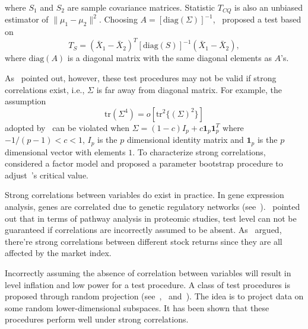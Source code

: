 \documentclass[review]{elsarticle}
\theoremstyle{plain}
\theoremstyle{definition}
\theoremstyle{remark}
\begin{document}
where $S_1$ and $S_2$ are sample covariance matrices. Statistic $T_{CQ}$ 
is also an unbiased estimator of $\|\mu_1-\mu_2\|^2$. Choosing $A={[\mathrm{diag}(\Sigma)]}^{-1}$,~\cite{Srivastava2008A} proposed a test based on
\begin{equation*}
    T_{S}={(\bar{X}_1-\bar{X}_2)}^T {[\mathrm{diag}(S)]}^{-1}(\bar{X}_1-\bar{X}_2),
\end{equation*}
where $\textrm{diag} (A)$ is a diagonal matrix with the same diagonal elements as $A$'s.

As~\cite{Ma2015A} pointed out, however, these test procedures may not be valid if strong correlations exist, i.e., $\Sigma$ is far away from diagonal matrix. For example, the assumption 
\begin{equation}\label{chenscondition}
\mathrm{tr}(\Sigma^4)=o[\mathrm{tr}^2\{{(\Sigma)}^2\}]
\end{equation}
adopted by~\cite{Chen2010A} can be violated when $\Sigma=(1-c)I_p+c\bm{1}_p \bm{1}_p^T$ where $-{1}/{(p-1)}<c<1$, $I_p$ is the $p$ dimensional identity matrix and $\bm{1}_p$ is the $p$ dimensional vector  with elements $1$.
To characterize strong correlations,~\cite{Ma2015A} considered a factor model and proposed a parameter bootstrap procedure to adjust~\cite{Chen2010A}'s critical value.

Strong correlations between variables do exist in practice. In gene expression analysis, genes are correlated due to genetic regulatory networks (see~\cite{Thulin2014A}).~\cite{Chen2011A} pointed out that in terms of pathway analysis in proteomic studies,  test level can not be guaranteed if correlations are incorrectly assumed to be absent.
 As~\cite{Ma2015A} argued, there're strong correlations between different stock returns since they are all affected by the market index.

Incorrectly assuming the absence of correlation between variables will result in level inflation and low power for a test procedure. A class of test procedures is proposed through random projection (see~\cite{Lopes2015A},~\cite{Thulin2014A} and~\cite{Srivastava2014RAPTT}). The idea is to project data on some random lower-dimensional subspaces. It has been shown that these
procedures perform well under strong correlations. 
\end{document}
